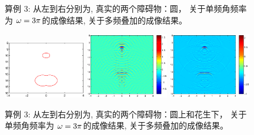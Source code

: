 {\begin{figure}[htbp]
	\caption{算例 3: 从左到右分别为,  真实的两个障碍物：圆， 关于单频角频率为 $\omega=3\pi$的成像结果, 关于多频叠加的成像结果。}\label{figure_31}
\end{figure}

\begin{figure}[htbp]
	\centering
	\includegraphics[width=0.32\textwidth,height=0.16\textheight]{./Img/graphic/circle_0_4_peanut_1_profile.eps}
	\includegraphics[width=0.32\textwidth]{./Img/graphic/circle_0_4_peanut_1_3pi_1.eps}
	\includegraphics[width=0.32\textwidth]{./Img/graphic/circle_0_4_peanut_1_multi_1.eps}
	
	\caption{算例 3: 从左到右分别为,  真实的两个障碍物：圆上和花生下， 关于单频角频率为 $\omega=3\pi$的成像结果, 关于多频叠加的成像结果。}\label{figure_32}
\end{figure}

}
